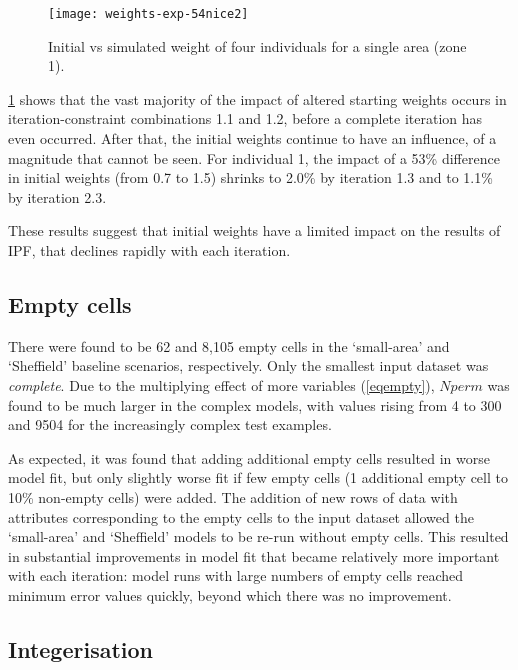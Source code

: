 \documentclass[a4paper,10pt]{article}
\providecommand{\DIFaddbeginFL}{} %
\providecommand{\DIFaddendFL}{} %
\providecommand{\DIFdelbeginFL}{} %
\providecommand{\DIFdelendFL}{} %
\begin{document}
\begin{figure}
 \begin{center}
  \DIFdelbeginFL %
\DIFdelendFL \DIFaddbeginFL \texttt{[image: weights-exp-54nice2]}
 \DIFaddendFL \end{center}
\caption{Initial vs simulated weight of four individuals for a single area (zone 1).}
\label{finweight}
\end{figure}

\cref{finweight} shows that the vast majority of the impact of altered starting weights occurs in iteration-constraint
combinations 1.1 and 1.2, before a complete iteration has even occurred.
After that, the initial weights continue to have an influence, of a magnitude that cannot be
seen. For individual 1, the impact of a 53\% difference in initial weights (from 0.7 to 1.5) shrinks to
2.0\% by iteration 1.3 and to 1.1\% by iteration 2.3.

These results suggest that initial weights have a limited impact on the results of IPF, that declines rapidly with each iteration.

\subsection{Empty cells}

There were found to be 62 and 8,105 empty cells in the `small-area' and `Sheffield'
baseline scenarios, respectively. Only the smallest input dataset was
\emph{complete}. Due to the multiplying effect of more variables (\cref{eqempty}),
$Nperm$ was found to be much larger in the complex models, with values rising from
4 to 300 and 9504 for the increasingly complex test examples.

As expected, it was found that adding additional empty cells
resulted in worse model fit, but only slightly worse fit if few empty
cells (1 additional empty cell to 10\% non-empty cells) were added.
The addition of new rows of data with attributes corresponding
to the empty cells to the input dataset allowed the `small-area' and `Sheffield'
models to be re-run without empty cells. This resulted in substantial improvements in
model fit that became relatively more important with each iteration: model
runs with large numbers of empty cells reached minimum error values quickly, beyond
which there was no improvement.

\subsection{Integerisation}
\end{document}
